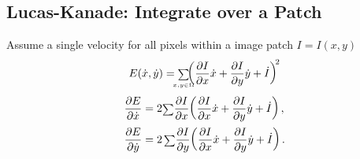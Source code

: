 \begin{compactdesc}
		\section{Lucas-Kanade: Integrate over a Patch}
		Assume a single velocity for all pixels within a image patch $I=I(x,y)$
		\begin{gather*}
			E(\dot{x},\dot{y})={\scriptstyle\sum\limits_{\mathclap{x,y\in\Omega}}^{}}\!{\left( \pdv{I}{x}\dot{x}+\pdv{I}{y}\dot{y}+\dot{I} \right)\!}^2
		\end{gather*}
		\begin{align*}
			\frac{\partial E}{\partial \dot{x}}&=2{\scriptstyle\sum\limits_{}^{}}\frac{\partial I}{\partial x}\!\left( \frac{\partial I}{\partial x}\dot{x}+\frac{\partial I}{\partial y}\dot{y}+\dot{I} \right),\\
			\frac{\partial E}{\partial \dot{y}}&={2\scriptstyle\sum\limits_{}^{}}\frac{\partial I}{\partial y}\!\left( \frac{\partial I}{\partial x}\dot{x}+\frac{\partial I}{\partial y}\dot{y}+\dot{I} \right).
		\end{align*}
\end{compactdesc}
